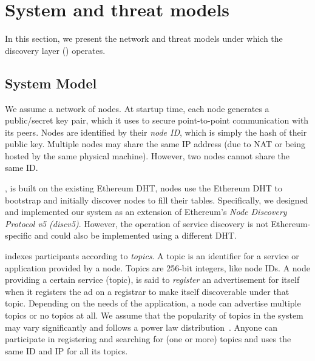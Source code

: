 
\section{System and threat models}
\label{sec:model}

In this section, we present the network and threat models under which the \sysname discovery layer () operates. 

\subsection{System Model}
We assume a network of nodes. At startup time, each node generates a public/secret key pair, which it uses to secure point-to-point communication with its peers. Nodes are identified by their \emph{node ID}, which is simply the hash of their public key. Multiple nodes may share the same IP address (due to NAT or being hosted by the same physical machine). However, two nodes cannot share the same ID.

\sysname, is built on the existing Ethereum DHT, \ie nodes use the Ethereum DHT to bootstrap and initially discover nodes to fill their tables. Specifically, we designed and implemented our system as an extension of Ethereum's \emph{Node Discovery Protocol v5 (discv5)}. However, the operation of service discovery is not Ethereum-specific and could also be implemented using a different DHT.

\sysname indexes participants according to \emph{topics}. A topic is an identifier for a
service or application provided by a node. Topics are 256-bit integers, like node IDs.
A node providing a certain service (topic), is said to \emph{register} an advertisement for itself when it registers the ad on a registrar to make itself discoverable under that topic. Depending on the needs of the application, a node can advertise multiple topics or no topics at all. We assume that the popularity of topics in the system may vary significantly and follows a power law distribution~\cite{kim2018measuring}. Anyone can participate in registering and searching for (one or more) topics and uses the same ID and IP for all its topics. 

